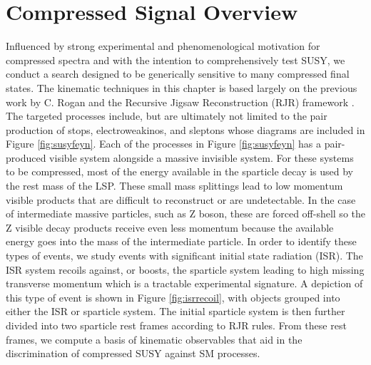 \section{Compressed Signal Overview}
Influenced by strong experimental and phenomenological motivation for compressed spectra and with the intention to comprehensively test SUSY, we conduct a search designed to be generically sensitive to many compressed final states. The kinematic techniques in this chapter is based largely on the previous work by C. Rogan and the Recursive Jigsaw Reconstruction (RJR) framework \cite{AN}\cite{PhysRevD.96.112007}. The targeted processes include, but are ultimately not limited to the pair production of stops, electroweakinos, and sleptons whose diagrams are included in Figure \ref{fig:susyfeyn}.  
Each of the processes in Figure \ref{fig:susyfeyn} has a pair-produced visible system alongside a massive invisible system. For these systems to be compressed, most of the energy available in the sparticle decay is used by the rest mass of the LSP. These small mass splittings lead to low momentum visible products that are difficult to reconstruct or are undetectable. In the case of intermediate massive particles, such as Z boson, these are forced off-shell so the Z visible decay products receive even less momentum because the available energy goes into the mass of the intermediate particle. In order to identify these types of events, we study events with significant initial state radiation (ISR). The ISR system recoils against, or boosts, the sparticle system leading to high missing transverse momentum which is a tractable experimental signature. A depiction of this type of event is shown in Figure \ref{fig:isrrecoil}, with objects grouped into either the ISR or sparticle system. The initial sparticle system is then further divided into two sparticle rest frames according to RJR rules. From these rest frames, we compute a basis of kinematic observables that aid in the discrimination of compressed SUSY against SM processes.

